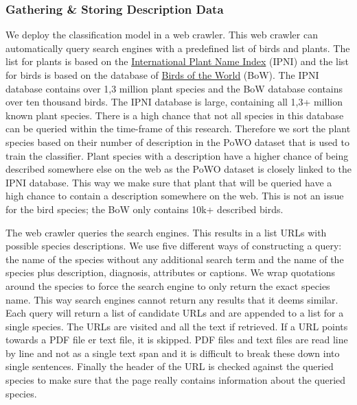 \documentclass[a4paper, 12pt, oneside]{book} %
\begin{document}
\subsubsection{Gathering \& Storing Description Data}
We deploy the classification model in a web crawler.
This web crawler can automatically query search engines with a predefined list of birds and plants.
The list for plants is based on the \href{https://www.ipni.org/}{International Plant Name Index} (IPNI) and the list for birds is based on the database of \href{https://birdsoftheworld.org/bow/home}{Birds of the World} (BoW).
The IPNI database contains over 1,3 million plant species and the BoW database contains over ten thousand birds.
The IPNI database is large, containing all 1,3+ million known plant species.
There is a high chance that not all species in this database can be queried within the time-frame of this research.
Therefore we sort the plant species based on their number of description in the PoWO dataset that is used to train the classifier.
Plant species with a description have a higher chance of being described somewhere else on the web as the PoWO dataset is closely linked to the IPNI database.
This way we make sure that plant that will be queried have a high chance to contain a description somewhere on the web.
This is not an issue for the bird species; the BoW only contains 10k+ described birds.

The web crawler queries the search engines. 
This results in a list URLs with possible species descriptions.
We use five different ways of constructing a query: the name of the species without any additional search term and the name of the species plus description, diagnosis, attributes or captions.
We wrap quotations around the species to force the search engine to only return the exact species name. 
This way search engines cannot return any results that it deems similar.
Each query will return a list of candidate URLs and are appended to a list for a single species.
The URLs are visited and all the text if retrieved.
If a URL points towards a PDF file er text file, it is skipped.
PDF files and text files are read line by line and not as a single text span and it is difficult to break these down into single sentences. 
Finally the header of the URL is checked against the queried species to make sure that the page really contains information about the queried species.
\end{document}
